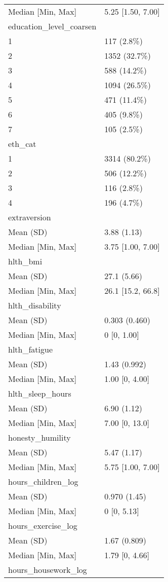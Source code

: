\documentclass[
  singlecolumn,
  9pt]{article}
\begin{document}
\begin{longtable}[]{@{}ll@{}}
Median {[}Min, Max{]} & 5.25 {[}1.50, 7.00{]} \\
education\_level\_coarsen & \\
1 & 117 (2.8\%) \\
2 & 1352 (32.7\%) \\
3 & 588 (14.2\%) \\
4 & 1094 (26.5\%) \\
5 & 471 (11.4\%) \\
6 & 405 (9.8\%) \\
7 & 105 (2.5\%) \\
eth\_cat & \\
1 & 3314 (80.2\%) \\
2 & 506 (12.2\%) \\
3 & 116 (2.8\%) \\
4 & 196 (4.7\%) \\
extraversion & \\
Mean (SD) & 3.88 (1.13) \\
Median {[}Min, Max{]} & 3.75 {[}1.00, 7.00{]} \\
hlth\_bmi & \\
Mean (SD) & 27.1 (5.66) \\
Median {[}Min, Max{]} & 26.1 {[}15.2, 66.8{]} \\
hlth\_disability & \\
Mean (SD) & 0.303 (0.460) \\
Median {[}Min, Max{]} & 0 {[}0, 1.00{]} \\
hlth\_fatigue & \\
Mean (SD) & 1.43 (0.992) \\
Median {[}Min, Max{]} & 1.00 {[}0, 4.00{]} \\
hlth\_sleep\_hours & \\
Mean (SD) & 6.90 (1.12) \\
Median {[}Min, Max{]} & 7.00 {[}0, 13.0{]} \\
honesty\_humility & \\
Mean (SD) & 5.47 (1.17) \\
Median {[}Min, Max{]} & 5.75 {[}1.00, 7.00{]} \\
hours\_children\_log & \\
Mean (SD) & 0.970 (1.45) \\
Median {[}Min, Max{]} & 0 {[}0, 5.13{]} \\
hours\_exercise\_log & \\
Mean (SD) & 1.67 (0.809) \\
Median {[}Min, Max{]} & 1.79 {[}0, 4.66{]} \\
hours\_housework\_log & \\

\end{longtable}
\end{document}

